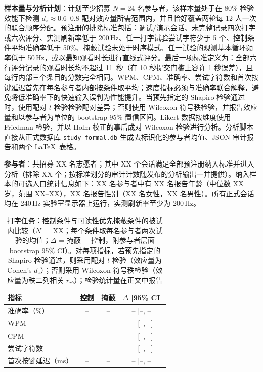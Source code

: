{\textbf{样本量与分析计划}：计划至少招募 $N=24$ 名参与者，该样本量处于在 80\% 检验效能下检测 $d_z\approx0.6$--$0.8$ 配对效应量所需范围内，并且恰好覆盖两轮每 12 人一次的联合顺序分配。预注册的排除标准包括：调试/演示会话、未完整记录四次打字或六次评分、实测刷新率低于 200\,Hz、任一打字试验尝试字符少于 5 个、控制条件平均准确率低于 50\%、掩蔽试验未处于时序模式、任一试验的观测基本循环频率低于 50\,Hz，或以最短观看时长进行直线式评分。最后一项标准定义为：全部六行评分记录的观看时长均不超过 11~秒（在 10 秒提交门槛上容许 1 秒误差），且每行内部三个条目的分数完全相同。WPM、CPM、准确率、尝试字符数和首次按键延迟首先在每名参与者内部按条件取平均；速度指标必须与准确率联合解释，避免将低准确率下的快速输入误判为性能提升。当预先指定的 Shapiro 检验通过时，使用配对 $t$ 检验检验配对差异；否则使用 Wilcoxon 符号秩检验，并报告效应量和以参与者为单位的 bootstrap 95\% 置信区间。Likert 数据按维度使用 Friedman 检验，并以 Holm 校正的事后成对 Wilcoxon 检验进行分析。分析脚本直接从正式数据库 \texttt{study\_formal.db} 生成去标识化的参与者均值、JSON 审计报告和两个 \LaTeX\ 表格。

\textbf{参与者}：共招募 XX 名志愿者；其中 XX 个会话满足全部预注册纳入标准并进入分析（排除 XX 个；按标准划分的审计计数随发布的分析输出一并提供）。纳入样本的可选人口统计信息如下：XX 名参与者中有 XX 名报告年龄（中位数 XX 岁，范围 XX--XX），XX 名报告性别（XX 名女性，XX 名男性）。所有正式会话均在 240\,Hz 实验室显示器上运行，实测刷新率至少为 200\,Hz。

\begin{table}[!t]
\caption{打字任务：控制条件与可读性优先掩蔽条件的被试内比较（$N=$ XX；每个条件取每名参与者两次试验的均值；$\Delta$ = 掩蔽 $-$ 控制，附参与者层面 bootstrap 95\% CI）。对每项指标，若预先指定的 Shapiro 检验通过，则采用配对 $t$ 检验（效应量为 Cohen's $d_z$）；否则采用 Wilcoxon 符号秩检验（效应量为秩二列相关 $r_{rb}$）；检验统计量在正文中报告}
\label{tab:study_typing}
\centering
\footnotesize
\setlength{\tabcolsep}{4pt}
\begin{tabular}{lccc}
\toprule
指标 & 控制 & 掩蔽 & $\Delta$ [95\% CI] \\
\midrule
准确率（\%） & -- & -- & -- [--, --] \\
WPM & -- & -- & -- [--, --] \\
CPM & -- & -- & -- [--, --] \\
尝试字符数 & -- & -- & -- [--, --] \\
首次按键延迟（ms） & -- & -- & -- [--, --] \\
\bottomrule
\end{tabular}
\end{table}

}
